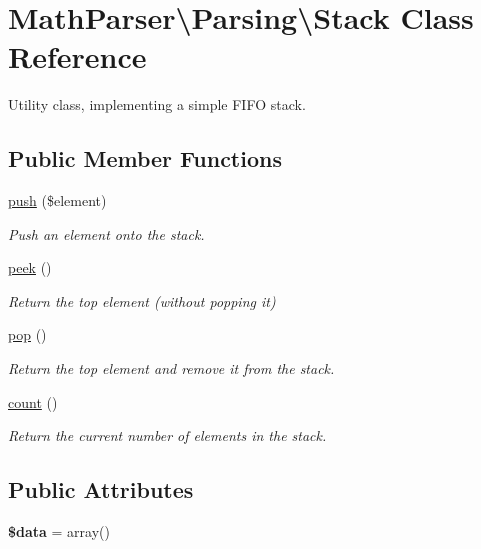 \hypertarget{classMathParser_1_1Parsing_1_1Stack}{\section{Math\-Parser\textbackslash{}Parsing\textbackslash{}Stack Class Reference}
\label{classMathParser_1_1Parsing_1_1Stack}
}


Utility class, implementing a simple F\-I\-F\-O stack.  


\subsection*{Public Member Functions}
\begin{DoxyCompactItemize}
\item 
\hyperlink{classMathParser_1_1Parsing_1_1Stack_a50f3a135fdf9401b17494c50652b152a}{push} (\$element)
\begin{DoxyCompactList}\small\item\em Push an element onto the stack. \end{DoxyCompactList}\item 
\hyperlink{classMathParser_1_1Parsing_1_1Stack_a13b5dc80388b7900af165e0822ebec93}{peek} ()
\begin{DoxyCompactList}\small\item\em Return the top element (without popping it) \end{DoxyCompactList}\item 
\hyperlink{classMathParser_1_1Parsing_1_1Stack_a23eff250a1077d7a9838a88e6755a84a}{pop} ()
\begin{DoxyCompactList}\small\item\em Return the top element and remove it from the stack. \end{DoxyCompactList}\item 
\hyperlink{classMathParser_1_1Parsing_1_1Stack_ad85713b07820a24a6e781b32e18271e6}{count} ()
\begin{DoxyCompactList}\small\item\em Return the current number of elements in the stack. \end{DoxyCompactList}\end{DoxyCompactItemize}
\subsection*{Public Attributes}
\begin{DoxyCompactItemize}
\item 
\hypertarget{classMathParser_1_1Parsing_1_1Stack_ab508efbeda55b29432f6aefbb591ca10}{{\bfseries \$data} = array()}\label{classMathParser_1_1Parsing_1_1Stack_ab508efbeda55b29432f6aefbb591ca10}

\end{DoxyCompactItemize}


